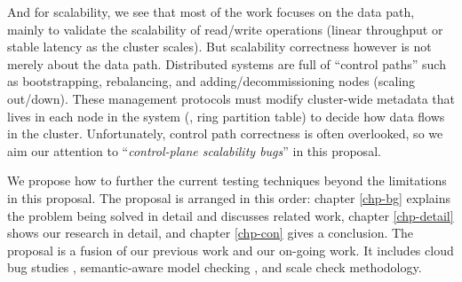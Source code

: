 And for scalability, we see that most of the work \cite{Calotoiu+13-ApmScaleBug,
Laguna+15-DebugAtScale, Shudler+15-ExascaleLib, Wang+14-Exalt, Zhou+11-Vrisha,
Zhou+13-Wukong} focuses on the data path, mainly to validate the scalability of
read/write operations (linear throughput or stable latency as the cluster
scales). But scalability correctness however is not merely about the data path.
Distributed systems are full of ``control paths'' such as bootstrapping,
rebalancing, and adding/decommissioning nodes (scaling out/down). These
management protocols must modify cluster-wide metadata that lives in each
node in the system (\eg, ring partition table) to decide how data flows in
the cluster. Unfortunately, control path correctness is often overlooked, so we
aim our attention to ``{\em control-plane scalability bugs}'' in this proposal.

We propose how to further the current testing techniques beyond the limitations
in this proposal. The proposal is arranged in this order: chapter \ref{chp-bg}
explains the problem being solved in detail and discusses related work, chapter
\ref{chp-detail} shows our research in detail, and chapter \ref{chp-con} gives a
conclusion.
%
The proposal is a fusion of our previous work and our on-going work. It includes
cloud bug studies \cite{Gunawi+14-Cbs, Leesatapornwongsa+16-TaxDC},
semantic-aware model checking \cite{Leesatapornwongsa+14-Samc}, and scale check
methodology.

\fi
